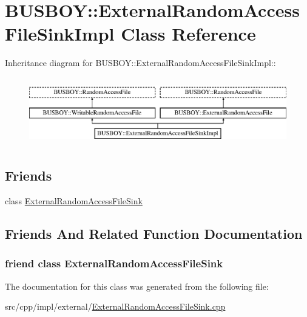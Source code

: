 \hypertarget{classBUSBOY_1_1ExternalRandomAccessFileSinkImpl}{
\section{BUSBOY::ExternalRandomAccessFileSinkImpl Class Reference}
\label{classBUSBOY_1_1ExternalRandomAccessFileSinkImpl}
}
Inheritance diagram for BUSBOY::ExternalRandomAccessFileSinkImpl::\begin{figure}[H]
\begin{center}
\leavevmode
\includegraphics[height=3cm]{classBUSBOY_1_1ExternalRandomAccessFileSinkImpl}
\end{center}
\end{figure}
\subsection*{Friends}
\begin{DoxyCompactItemize}
\item 
class \hyperlink{classBUSBOY_1_1ExternalRandomAccessFileSinkImpl_a39ec1abcf6f70d878c47e874d5bd9ac1}{ExternalRandomAccessFileSink}
\end{DoxyCompactItemize}


\subsection{Friends And Related Function Documentation}
\hypertarget{classBUSBOY_1_1ExternalRandomAccessFileSinkImpl_a39ec1abcf6f70d878c47e874d5bd9ac1}{
\subsubsection[{ExternalRandomAccessFileSink}]{\setlength{\rightskip}{0pt plus 5cm}friend class {\bf ExternalRandomAccessFileSink}}}
\label{classBUSBOY_1_1ExternalRandomAccessFileSinkImpl_a39ec1abcf6f70d878c47e874d5bd9ac1}


The documentation for this class was generated from the following file:\begin{DoxyCompactItemize}
\item 
src/cpp/impl/external/\hyperlink{ExternalRandomAccessFileSink_8cpp}{ExternalRandomAccessFileSink.cpp}\end{DoxyCompactItemize}
